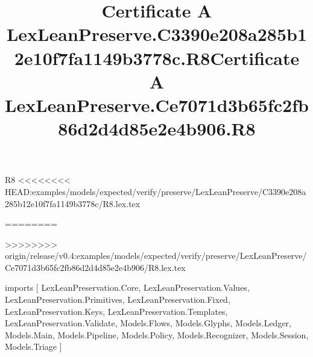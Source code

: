 \begin{lexlean}{R8}
<<<<<<<< HEAD:examples/models/expected/verify/preserve/LexLeanPreserve/C3390e208a285b12e10f7fa1149b3778c/R8.lex.tex
\title{Certificate A LexLeanPreserve.C3390e208a285b12e10f7fa1149b3778c.R8}
========
\title{Certificate A LexLeanPreserve.Ce7071d3b65fc2fb86d2d4d85e2e4b906.R8}
>>>>>>>> origin/release/v0.4:examples/models/expected/verify/preserve/LexLeanPreserve/Ce7071d3b65fc2fb86d2d4d85e2e4b906/R8.lex.tex
\begin{coremodule}
imports [
  LexLeanPreservation.Core,
  LexLeanPreservation.Values,
  LexLeanPreservation.Primitives,
  LexLeanPreservation.Fixed,
  LexLeanPreservation.Keys,
  LexLeanPreservation.Templates,
  LexLeanPreservation.Validate,
  Models.Flows,
  Models.Glyphs,
  Models.Ledger,
  Models.Main,
  Models.Pipeline,
  Models.Policy,
  Models.Recognizer,
  Models.Session,
  Models.Triage
]


\end{coremodule}
\end{lexlean}

